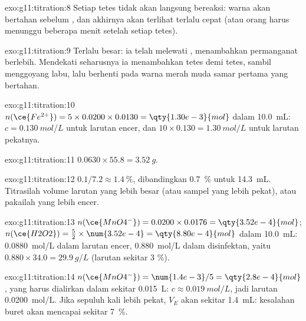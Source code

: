 \begin{solution}{exo:g11:titration:8}
Setiap tetes tidak akan langsung bereaksi: warna  akan bertahan
sebelum , dan akhirnya akan terlihat terlalu cepat (atau
orang harus menunggu beberapa menit setelah setiap tetes).
\end{solution}

\begin{solution}{exo:g11:titration:9}
Terlalu besar: ia telah melewati , menambahkan
permanganat berlebih. Mendekati  seharusnya ia
menambahkan  tetes demi tetes, sambil menggoyang labu, lalu
berhenti pada warna merah muda samar pertama yang bertahan.
\end{solution}

\begin{solution}{exo:g11:titration:10}
$n(\ce{Fe^{2+}}) = 5 \times 0.0200 \times 0.0130 = \qty{1.30e-3}{mol}$
dalam \qty{10.0}{mL}: $c = \qty{0.130}{mol/L}$ untuk larutan encer, dan
$10 \times 0.130 = \qty{1.30}{mol/L}$ untuk larutan pekatnya.
\end{solution}

\begin{solution}{exo:g11:titration:11}
$0.0630 \times 55.8 = \qty{3.52}{g}$.
\end{solution}

\begin{solution}{exo:g11:titration:12}
$0.1 / 7.2 \approx \qty{1.4}{\percent}$, dibandingkan
\qty{0.7}{\percent} untuk \qty{14.3}{mL}. Titrasilah volume larutan yang
lebih besar (atau sampel yang lebih pekat), atau pakailah  yang
lebih encer.
\end{solution}

\begin{solution}{exo:g11:titration:13}
$n(\ce{MnO4^-}) = 0.0200 \times 0.0176 = \qty{3.52e-4}{mol}$;
$n(\ce{H2O2}) = \frac{5}{2} \times \num{3.52e-4} = \qty{8.80e-4}{mol}$
dalam \qty{10.0}{mL}: \qty{0.0880}{mol/L} dalam larutan encer,
\qty{0.880}{mol/L} dalam disinfektan, yaitu
$0.880 \times 34.0 = \qty{29.9}{g/L}$ (larutan sekitar 3 \%).
\end{solution}

\begin{solution}{exo:g11:titration:14}
$n(\ce{MnO4^-}) = \num{1.4e-3} / 5 = \qty{2.8e-4}{mol}$, yang harus
dialirkan dalam sekitar \qty{0.015}{L}: $c \approx \qty{0.019}{mol/L}$,
jadi larutan \qty{0.0200}{mol/L}. Jika sepuluh kali lebih pekat, $V_E$
akan sekitar \qty{1.4}{mL}: kesalahan buret akan mencapai sekitar
\qty{7}{\percent}.
\end{solution}

